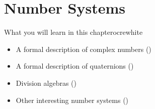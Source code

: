 %




\renewcommand{\chaptergraphicspath}{../src/NumberSystems/eps/}

\chapterimage{\noheaderimage}
\renewcommand{\chabbr}{NUMSYS}

\chapter{Number Systems\label{chap:NumberSystems}}

\begin{messagebox}{What you will learn in this chapter}{ocre}{\icinfo}{white}
\begin{itemize}
	\item A formal description of complex numbers ()
	\item A formal description of quaternions ()
	\item Division algebras ()
	\item Other interesting number systems ()
\end{itemize}
\end{messagebox}

